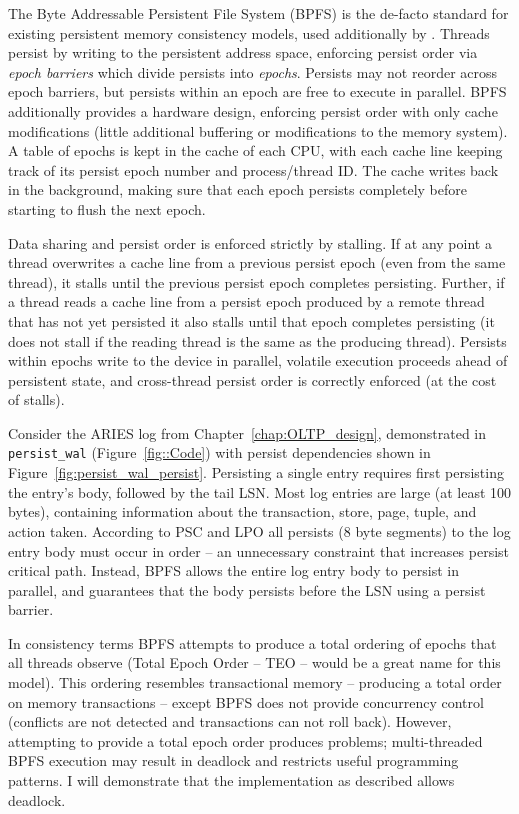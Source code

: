 The Byte Addressable Persistent File System (BPFS) \cite{ConditNightingale09} is the de-facto standard for existing persistent memory consistency models, used additionally by \cite{CoburnCaulfield11, FangHsiao11, VenkataramanTolia11}.
Threads persist by writing to the persistent address space, enforcing persist order via \emph{epoch barriers} which divide persists into \emph{epochs}.
Persists may not reorder across epoch barriers, but persists within an epoch are free to execute in parallel.
BPFS additionally provides a hardware design, enforcing persist order with only cache modifications (little additional buffering or modifications to the memory system).
A table of epochs is kept in the cache of each CPU, with each cache line keeping track of its persist epoch number and process/thread ID.
The cache writes back in the background, making sure that each epoch persists completely before starting to flush the next epoch.

Data sharing and persist order is enforced strictly by stalling.
If at any point a thread overwrites a cache line from a previous persist epoch (even from the same thread), it stalls until the previous persist epoch completes persisting.
Further, if a thread reads a cache line from a persist epoch produced by a remote thread that has not yet persisted it also stalls until that epoch completes persisting (it does not stall if the reading thread is the same as the producing thread).
Persists within epochs write to the device in parallel, volatile execution proceeds ahead of persistent state, and cross-thread persist order is correctly enforced (at the cost of stalls).



Consider the ARIES log from Chapter~\ref{chap:OLTP_design}, demonstrated in \texttt{persist\_wal} (Figure~\ref{fig::Code}) with persist dependencies shown in Figure~\ref{fig:persist_wal_persist}.
Persisting a single entry requires first persisting the entry's body, followed by the tail LSN.
Most log entries are large (at least 100 bytes), containing information about the transaction, store, page, tuple, and action taken.
According to PSC and LPO all persists (8 byte segments) to the log entry body must occur in order -- an unnecessary constraint that increases persist critical path.
Instead, BPFS allows the entire log entry body to persist in parallel, and guarantees that the body persists before the LSN using a persist barrier.

In consistency terms BPFS attempts to produce a total ordering of epochs that all threads observe (Total Epoch Order -- TEO -- would be a great name for this model).
This ordering resembles transactional memory -- producing a total order on memory transactions -- except BPFS does not provide concurrency control (conflicts are not detected and transactions can not roll back).
However, attempting to provide a total epoch order produces problems; multi-threaded BPFS execution may result in deadlock and restricts useful programming patterns.
I will demonstrate that the implementation as described allows deadlock.

